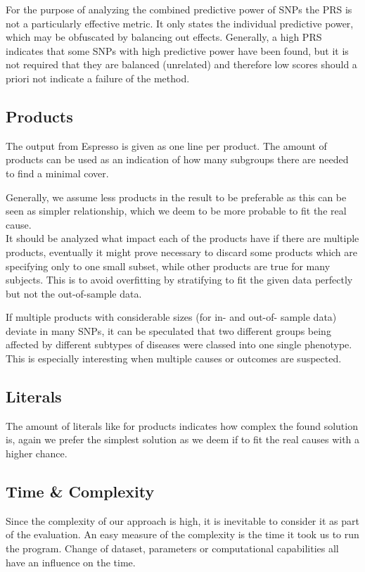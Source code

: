 \documentclass[letterpaper, 11pt]{article}
\begin{document}
For the purpose of analyzing the combined predictive power of SNPs the PRS is not a particularly effective metric. It only states the individual predictive power, which may be obfuscated by balancing out effects. Generally, a high PRS indicates that  some SNPs with high predictive power have been found, but it is not required that they are balanced (unrelated) and therefore low scores should a priori not indicate a failure of the method. \\


\subsection{Products}
The output from Espresso is given as one line per product. The amount of products can be used as an indication of how many subgroups there are needed to find a minimal cover.

Generally, we assume less products in the result to be preferable as this can be seen as simpler relationship, which we deem to be more probable to fit the real cause. \\

It should be analyzed what impact each of the products have if there are multiple products, eventually it might prove necessary to discard some products which are specifying only to one small subset, while other products are true for many subjects. This is to avoid overfitting by stratifying to fit the given data perfectly but not the out-of-sample data.

If multiple products with considerable sizes (for in- and out-of- sample data) deviate in many SNPs, it can be speculated that two different groups being affected by different subtypes of diseases were classed into one single phenotype. This is especially interesting when multiple causes or outcomes are suspected. 
\subsection{Literals}
The amount of literals like for products indicates how complex the found solution is, again we prefer the simplest solution as we deem if to fit the real causes with a higher chance.
\subsection{Time \& Complexity}
Since the complexity of our approach is high, it is inevitable to consider it as part of the evaluation. An easy measure of the complexity is the time it took us to run the program. Change of dataset, parameters or computational  capabilities all have an influence on the time.
\end{document}

